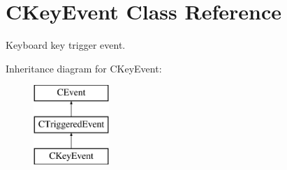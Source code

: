 \hypertarget{classCKeyEvent}{\section{C\-Key\-Event Class Reference}
\label{classCKeyEvent}
}


Keyboard key trigger event.  


Inheritance diagram for C\-Key\-Event\-:\begin{figure}[H]
\begin{center}
\leavevmode
\includegraphics[height=3.000000cm]{classCKeyEvent}
\end{center}
\end{figure}
